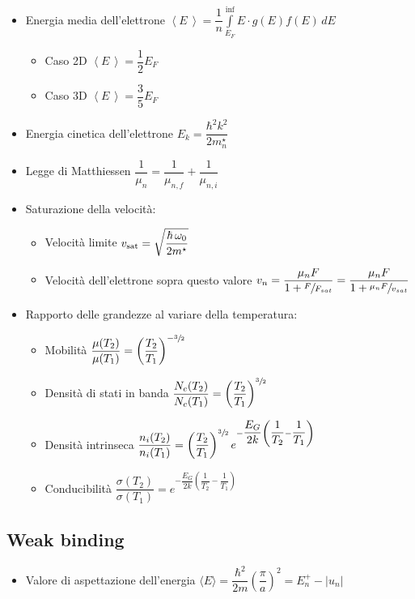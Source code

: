 \documentclass{article}
\begin{document}
\begin{itemize}
\begin{itemize}
        \end{itemize}
  \item Energia media dell'elettrone \( \displaystyle \left<E\,\right> = \dfrac{1}{n} \int\limits_{E_F}^{\inf} E \cdot g(E) f(E) \, dE \)
        \begin{itemize}
          \item Caso 2D \(\left<E\,\right> = \dfrac{1}{2} E_F \)
          \item Caso 3D \(\left<E\,\right> = \dfrac{3}{5} E_F \)
        \end{itemize}
  \item Energia cinetica dell'elettrone \( E_k = \dfrac{\hbar^2 k^2}{2 m_n^\star} \)
  \item Legge di Matthiessen \( \dfrac{1}{\mu_n} = \dfrac{1}{\mu_{n, f}} + \dfrac{1}{\mu_{n, i}} \)

        \newpage

  \item Saturazione della velocità:
        \begin{itemize}
          \item Velocità limite \( v_{\textnormal{sat}} = \sqrt{\dfrac{\hbar \, \omega_{0}}{2m^\star}} \)
          \item Velocità dell'elettrone sopra questo valore \( v_n = \dfrac{\mu_n F}{1 + \sfrac{F}{F_{sat}}} = \dfrac{\mu_n F }{1 + \sfrac{\mu_n F}{v_{sat}}} \)
        \end{itemize}
  \item Rapporto delle grandezze al variare della temperatura:
        \begin{itemize}
          \item Mobilità \( \dfrac{\mu (T_2)}{\mu (T_1)} = \left( \dfrac{T_2}{T_1} \right) ^ {-\sfrac{3}{2}} \)
          \item Densità di stati in banda \( \dfrac{N_c (T_2)}{N_c  (T_1)} = \left( \dfrac{T_2}{T_1} \right) ^ {\sfrac{3}{2}} \)
          \item Densità intrinseca \( \dfrac{n_i (T_2)}{n_i (T_1)} = \left(\dfrac{T_2}{T_1}\right) ^ {\sfrac{3}{2}} e ^ {- \dfrac{E_G}{2 k} \left(\dfrac{1}{T_2} - \dfrac{1}{T_1} \right) } \)
          \item Conducibilità \( \dfrac{\sigma (T_2)}{\sigma (T_1)} = e ^ {- \dfrac{E_G}{2 k} \left(\dfrac{1}{T_2} - \dfrac{1}{T_1} \right) } \)
        \end{itemize}
\end{itemize}

\subsection{Weak binding}
\begin{itemize}
  \item Valore di aspettazione dell'energia \( \langle E \rangle = \dfrac{\hbar ^ 2}{2 m} \left(\dfrac{\pi}{a}\right) ^ 2 = E_n^+ - | u_n | \)
\end{itemize}
\end{document}
